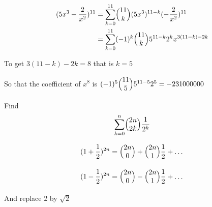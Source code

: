 \begin{solution}

\begin{align*}
(5x^3-\frac{2}{x^2})^{11} &= \sum_{k = 0} ^{11} \mybinom{11}{k} (5x^3)^{11-k} (-\frac{2}{x^2})^{11} \\
& = \sum_{k = 0} ^{11} (-1)^k \mybinom{11}{k} 5^{11-k} 2^k x^{3(11-k)-2k}
\end{align*}

To get ${3(11-k)-2k} = 8$ that is $k=5$

So that the coefficient of $x^8$ is $(-1)^5 \mybinom{11}{5} 5^{11-5} 2^5 = -231000000$


\end{solution}

\begin{exmp}
Find \[\sum_{k=0}^n \mybinom{2n}{2k} \frac{1}{2^k}\]
\end{exmp}

\begin{solution}
\[
(1+\frac{1}{2})^{2n} = \mybinom{2n}{0} + \mybinom{2n}{1} \frac{1}{2} + \dots  
\]

\[
(1-\frac{1}{2})^{2n} = \mybinom{2n}{0} - \mybinom{2n}{1} \frac{1}{2} + \dots  
\]

And replace 2 by $\sqrt{2}$

\end{solution}




